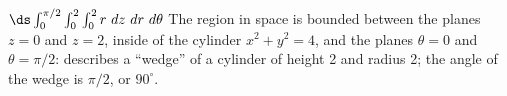 {
$\ds \int_0^{\pi/2}\int_0^2\int_0^2 r\ dz\ dr\ d\theta$
}
{The region in space is bounded between the planes $z=0$ and $z=2$, inside of the cylinder $x^2+y^2=4$, and the planes $\theta = 0$ and $\theta = \pi/2$: describes a ``wedge'' of a cylinder of height 2 and radius 2; the angle of the wedge is $\pi/2$, or $90^\circ$.
}
